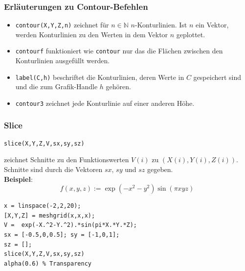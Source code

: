 % 
% 
\begin{frame}[fragile]\frametitle{Erläuterungen zu Contour-Befehlen}
\begin{itemize}
\item \lstinline!contour(X,Y,Z,n)! zeichnet f\"ur $n\in \mathbb{N}$
  $n$-Konturlinien. Ist $n$ ein Vektor, werden Konturlinien zu den Werten in
  dem Vektor $n$ geplottet.
\item \lstinline!contourf! funktioniert wie \lstinline!contour! nur das die Flächen
  zwischen den Konturlinien ausgefüllt werden.
\item \lstinline!label(C,h)! beschriftet die Konturlinien, deren Werte in $C$
  gespeichert sind und die zum Grafik-Handle $h$ gehören.
\item \lstinline!contour3! zeichnet jede Konturlinie auf einer anderen H\"ohe.
\end{itemize}
\end{frame}
%
% 
\begin{frame}[fragile]\frametitle{Slice}
\begin{lstlisting}
slice(X,Y,Z,V,sx,sy,sz)
\end{lstlisting}
zeichnet  Schnitte zu den Funktionswerten $V(i)$ zu
$(X(i),Y(i),Z(i))$. Schnitte sind durch die Vektoren $sx$, $sy$ und $sz$
gegeben.\\
\textbf{Beispiel}: \alert{ \[ f(x,y,z):=\exp(-x^2-y^2)\sin(\pi x y z) \]}
\begin{lstlisting}
x = linspace(-2,2,20);
[X,Y,Z] = meshgrid(x,x,x);
V =  exp(-X.^2-Y.^2).*sin(pi*X.*Y.*Z);
sx = [-0.5,0,0.5]; sy = [-1,0,1]; 
sz = [];
slice(X,Y,Z,V,sx,sy,sz)
alpha(0.6) % Transparency
\end{lstlisting}
\end{frame}


